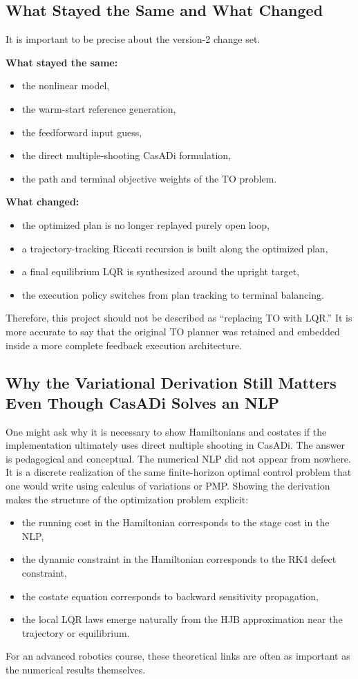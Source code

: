 \documentclass[conference]{IEEEtran}
\begin{document}
\subsection{What Stayed the Same and What Changed}
It is important to be precise about the version-2 change set.

\textbf{What stayed the same:}
\begin{itemize}
\item the nonlinear model,
\item the warm-start reference generation,
\item the feedforward input guess,
\item the direct multiple-shooting CasADi formulation,
\item the path and terminal objective weights of the TO problem.
\end{itemize}

\textbf{What changed:}
\begin{itemize}
\item the optimized plan is no longer replayed purely open loop,
\item a trajectory-tracking Riccati recursion is built along the optimized plan,
\item a final equilibrium LQR is synthesized around the upright target,
\item the execution policy switches from plan tracking to terminal balancing.
\end{itemize}

Therefore, this project should not be described as ``replacing TO with LQR.'' It is more accurate to say that the original TO planner was retained and embedded inside a more complete feedback execution architecture.

\subsection{Why the Variational Derivation Still Matters Even Though CasADi Solves an NLP}
One might ask why it is necessary to show Hamiltonians and costates if the implementation ultimately uses direct multiple shooting in CasADi. The answer is pedagogical and conceptual. The numerical NLP did not appear from nowhere. It is a discrete realization of the same finite-horizon optimal control problem that one would write using calculus of variations or PMP. Showing the derivation makes the structure of the optimization problem explicit:
\begin{itemize}
\item the running cost in the Hamiltonian corresponds to the stage cost in the NLP,
\item the dynamic constraint in the Hamiltonian corresponds to the RK4 defect constraint,
\item the costate equation corresponds to backward sensitivity propagation,
\item the local LQR laws emerge naturally from the HJB approximation near the trajectory or equilibrium.
\end{itemize}
For an advanced robotics course, these theoretical links are often as important as the numerical results themselves.
\end{document}
